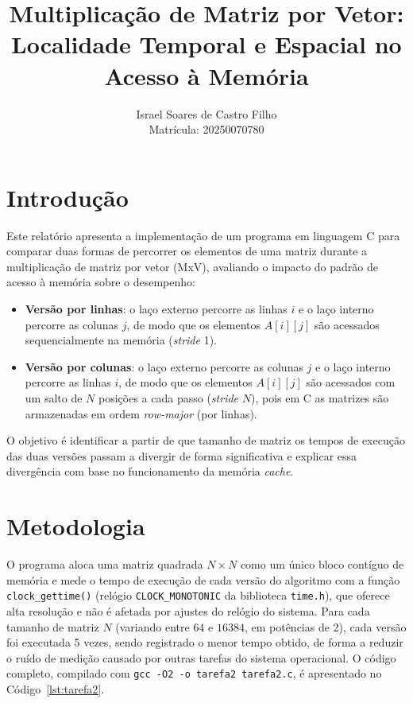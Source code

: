 \documentclass[a4paper,12pt]{article}
\title{Multiplicação de Matriz por Vetor: \\ Localidade Temporal e Espacial no Acesso à Memória}
\author{Israel Soares de Castro Filho \\ Matrícula: 20250070780}
\date{}
\begin{document}
\maketitle

\section{Introdução}

Este relatório apresenta a implementação de um programa em linguagem C para
comparar duas formas de percorrer os elementos de uma matriz durante a
multiplicação de matriz por vetor (MxV), avaliando o impacto do padrão de
acesso à memória sobre o desempenho:

\begin{itemize}
    \item \textbf{Versão por linhas}: o laço externo percorre as linhas $i$ e o
    laço interno percorre as colunas $j$, de modo que os elementos $A[i][j]$ são
    acessados sequencialmente na memória (\emph{stride} 1).
    \item \textbf{Versão por colunas}: o laço externo percorre as colunas $j$ e o
    laço interno percorre as linhas $i$, de modo que os elementos $A[i][j]$ são
    acessados com um salto de $N$ posições a cada passo (\emph{stride} $N$), pois
    em C as matrizes são armazenadas em ordem \emph{row-major} (por linhas).
\end{itemize}

O objetivo é identificar a partir de que tamanho de matriz os tempos de execução
das duas versões passam a divergir de forma significativa e explicar essa
divergência com base no funcionamento da memória \emph{cache}.

\section{Metodologia}

O programa aloca uma matriz quadrada $N \times N$ como um único bloco contíguo de
memória e mede o tempo de execução de cada versão do algoritmo com a função
\texttt{clock\_gettime()} (relógio \texttt{CLOCK\_MONOTONIC} da biblioteca
\texttt{time.h}), que oferece alta resolução e não é afetada por ajustes do
relógio do sistema. Para cada tamanho de matriz $N$ (variando entre $64$ e
$16384$, em potências de 2), cada versão foi executada 5 vezes, sendo
registrado o menor tempo obtido, de forma a reduzir o ruído de medição causado
por outras tarefas do sistema operacional. O código completo, compilado com
\texttt{gcc -O2 -o tarefa2 tarefa2.c}, é apresentado no Código~\ref{lst:tarefa2}.
\end{document}
